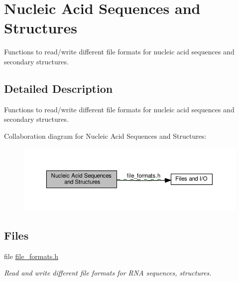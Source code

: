 \hypertarget{group__file__formats}{}\section{Nucleic Acid Sequences and Structures}
\label{group__file__formats}


Functions to read/write different file formats for nucleic acid sequences and secondary structures.  




\subsection{Detailed Description}
Functions to read/write different file formats for nucleic acid sequences and secondary structures. 

Collaboration diagram for Nucleic Acid Sequences and Structures\+:
\nopagebreak
\begin{figure}[H]
\begin{center}
\leavevmode
\includegraphics[width=350pt]{group__file__formats}
\end{center}
\end{figure}
\subsection*{Files}
\begin{DoxyCompactItemize}
\item 
file \hyperlink{io_2file__formats_8h}{file\+\_\+formats.\+h}
\begin{DoxyCompactList}\small\item\em Read and write different file formats for R\+NA sequences, structures. \end{DoxyCompactList}\end{DoxyCompactItemize}
